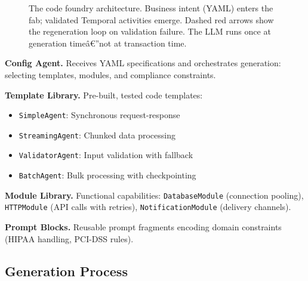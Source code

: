 \documentclass[11pt]{article}
\begin{document}
\begin{figure}[ht]
{
}%
\caption{The code foundry architecture. Business intent (YAML) enters the fab; validated Temporal activities emerge. Dashed red arrows show the regeneration loop on validation failure. The LLM runs once at generation timeâ€”not at transaction time.}
\label{fig:architecture}
\end{figure}

\textbf{Config Agent.} Receives YAML specifications and orchestrates generation: selecting templates, modules, and compliance constraints.

\textbf{Template Library.} Pre-built, tested code templates:
\begin{itemize}
    \item \texttt{SimpleAgent}: Synchronous request-response
    \item \texttt{StreamingAgent}: Chunked data processing
    \item \texttt{ValidatorAgent}: Input validation with fallback
    \item \texttt{BatchAgent}: Bulk processing with checkpointing
\end{itemize}

\textbf{Module Library.} Functional capabilities: \texttt{DatabaseModule} (connection pooling), \texttt{HTTPModule} (API calls with retries), \texttt{NotificationModule} (delivery channels).

\textbf{Prompt Blocks.} Reusable prompt fragments encoding domain constraints (HIPAA handling, PCI-DSS rules).

\subsection{Generation Process}
\end{document}
